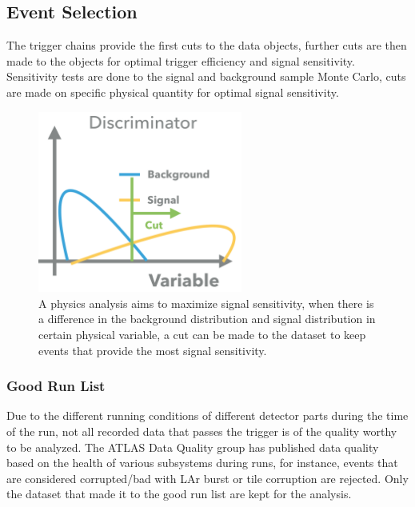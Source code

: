 \subsection{Event Selection}
The trigger chains provide the first cuts to the data objects, further cuts are then made to the objects for optimal trigger efficiency and signal sensitivity. Sensitivity tests are done to the signal and background sample Monte Carlo, cuts are made on specific physical quantity for optimal signal sensitivity.

\begin{figure}[!htb]
    \begin{center}
        \includegraphics[width=0.6\textwidth]{figures/chapter_analysismethod/Discriminator}
        \caption{
            A physics analysis aims to maximize signal sensitivity, when there is a difference in the background distribution and signal distribution in certain physical variable, a cut can be made to the dataset to keep events that provide the most signal sensitivity. 
        }
        \label{fig:triggerturnon}
    \end{center}
\end{figure}



\subsubsection{Good Run List}
Due to the different running conditions of different detector parts during the time of the run, not all recorded data that passes the trigger is of the quality worthy to be analyzed. The ATLAS Data Quality group has published data quality based on the health of various subsystems during runs, for instance, events that are considered corrupted/bad with LAr burst or tile corruption are rejected. Only the dataset that made it to the good run list are kept for the analysis.

